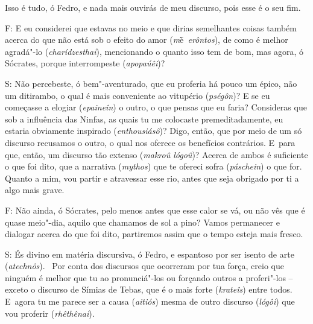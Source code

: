 Isso é tudo, ó Fedro, e nada mais ouvirás de meu discurso, pois esse é o
seu fim.

F: E eu considerei que estavas no meio e que dirias semelhantes coisas
também acerca do que não está sob o efeito do amor
(\emph{m}ḕ\emph{~erôntos}), de como é melhor agradá"-lo
(\emph{charídzesthai}), mencionando o quanto isso tem de bom, mas agora,
ó Sócrates, porque interrompeste (\emph{apopaúêi})?

\bekker{[241e]} S: Não percebeste, ó bem"-aventurado, que eu proferia há pouco
um épico, não um ditirambo, o qual é mais conveniente ao vitupério
(\emph{pségôn})? E se eu começasse a elogiar (\emph{epaineîn}) o outro,
o que pensas que eu faria? Consideras que sob a influência das Ninfas,
as quais tu me colocaste premeditadamente, eu estaria obviamente
inspirado (\emph{enthousiásô})? Digo, então, que por meio de um só
discurso recusamos o outro, o qual nos oferece os benefícios contrários.
E~para que, então, um discurso tão extenso (\emph{makroû lógoû})? Acerca
de ambos é suficiente o que foi dito, que a narrativa (\emph{mythos})
que te ofereci sofra (\emph{páschein}) o que for.~\bekker{[242a]} Quanto a
mim, vou partir e atravessar esse rio, antes que seja obrigado por ti a
algo mais grave.

F: Não ainda, ó Sócrates, pelo menos antes que esse calor se vá, ou não
vês que é quase meio"-dia, aquilo que chamamos de sol a pino? Vamos
permanecer e dialogar acerca do que foi dito, partiremos assim que o
tempo esteja mais fresco.

S: És divino em matéria discursiva, ó Fedro, e espantoso por ser isento
de arte (\emph{atechnôs}).~\bekker{[242b]} Por conta dos discursos que
ocorreram por tua força, creio que ninguém é melhor que tu ao
pronunciá"-los ou forçando outros a proferi"-los -- exceto o discurso de
Símias de Tebas, que é o mais forte (\emph{krateîs}) entre todos. E~agora tu me parece ser a causa (\emph{aitiós}) mesma de outro discurso
(\emph{lógôi}) que vou proferir (\emph{rhêthênai}). 


